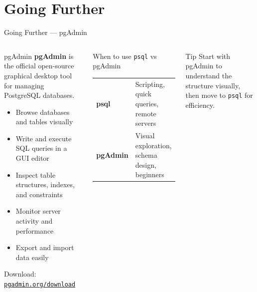 \section{Going Further}

\begin{frame}{Going Further — pgAdmin}
  \begin{columns}[T]
      \begin{block}{\faDesktop\; pgAdmin}
        \textbf{pgAdmin} is the official open-source graphical desktop tool
        for managing PostgreSQL databases.

        \vspace{0.4em}
        \begin{itemize}
          \item Browse databases and tables visually
          \item Write and execute SQL queries in a GUI editor
          \item Inspect table structures, indexes, and constraints
          \item Monitor server activity and performance
          \item Export and import data easily
        \end{itemize}

        \vspace{0.4em}
        Download: \href{https://www.pgadmin.org/download/}{\texttt{pgadmin.org/download}}
      \end{block}

      \begin{exampleblock}{When to use \texttt{psql} vs pgAdmin}
        \vspace{0.2em}
        \begin{tabular}{p{1.4cm}p{2cm}}
          \textbf{psql} & Scripting, quick queries, remote servers \\[6pt]
          \textbf{pgAdmin} & Visual exploration, schema design, beginners \\
        \end{tabular}
      \end{exampleblock}

      \vspace{0.5em}
      \begin{alertblock}{\faLightbulb\; Tip}
        Start with pgAdmin to understand the structure visually, then move to \texttt{psql} for efficiency.
      \end{alertblock}
  \end{columns}
\end{frame}